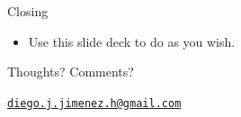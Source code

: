
\begin{frame}{Closing}

\begin{itemize}
\item Use this slide deck to do as you wish.
\end{itemize}

\vfill
\begin{center}
{\displayfamily\LARGE Thoughts? Comments?}

\vspace{1em}
{\texttt{\Large\href{mailto:diego.j.jimenez.h@gmail.com}{diego.j.jimenez.h@gmail.com}}}
\end{center}
\vfill

\end{frame}
